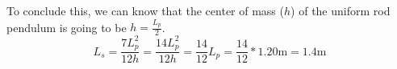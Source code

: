 \documentclass[12pt]{article}
\begin{document}
To conclude this, we can know that the center of mass ($h$) of the uniform rod pendulum is going to be \(h = \frac{L_p}{2}\).
\begin{equation}
    L_s =   \frac{7L_p^2}{12h}
        =   \frac{14L_p^2}{12h}
        =   \frac{14}{12}L_p
        =   \frac{14}{12}*1.20\unit{\meter}
        =   \boxed{1.4\unit{\meter}}
\end{equation}
\end{document}
